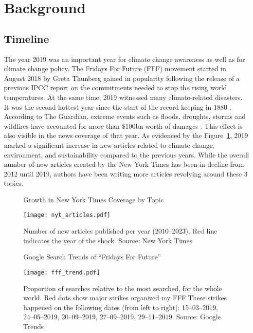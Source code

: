 \documentclass[12pt]{article}
\begin{document}
\section{Background}\label{sect:background}

\subsection{Timeline} 

The year 2019 was an important year for climate change awareness as well as for climate change policy. The Fridays For Future (FFF) movement started in August 2018 by Greta Thunberg gained in popularity following the release of a previous IPCC report on the commitments needed to stop the rising world temperatures. At the same time, 2019 witnessed many climate-related disasters. It was the second-hottest year since the start of the record keeping in 1880 \parencite{noaa2019global}. According to The Guardian, extreme events such as floods, droughts, storms and wildfires have accounted for more than \$100bn worth of damages \parencite{harvey2019climate}. This effect is also visible in the news coverage of that year. As evidenced by the Figure~\ref{fig:news_trends}, 2019 marked a significant increase in new articles related to climate change, environment, and sustainability compared to the previous years. While the overall number of new articles created by the New York Times has been in decline from 2012 until 2019, authors have been writing more articles revolving around these 3 topics.


\begin{figure}[t]
    \caption{Growth in New York Times Coverage by Topic}\label{fig:news_trends}
    \texttt{[image: nyt\_articles.pdf]}
    \captionsetup{font=footnotesize}
    \caption*{Number of new articles published per year (2010--2023). Red line indicates the year of the shock. Source: New York Times}
\end{figure}

\begin{figure}[t]
    \caption{Google Search Trends of ``Fridays For Future''}\label{fig:fff_trend}
    \texttt{[image: fff\_trend.pdf]}
    \captionsetup{font=footnotesize}
    \caption*{Proportion of searches relative to the most searched, for the whole world. Red dots show major strikes organized my FFF.\@ These strikes happened on the following dates (from left to right): 15--03--2019, 24--05--2019, 20--09--2019, 27--09--2019, 29--11--2019. Source: Google Trends}
\end{figure}
\end{document}
